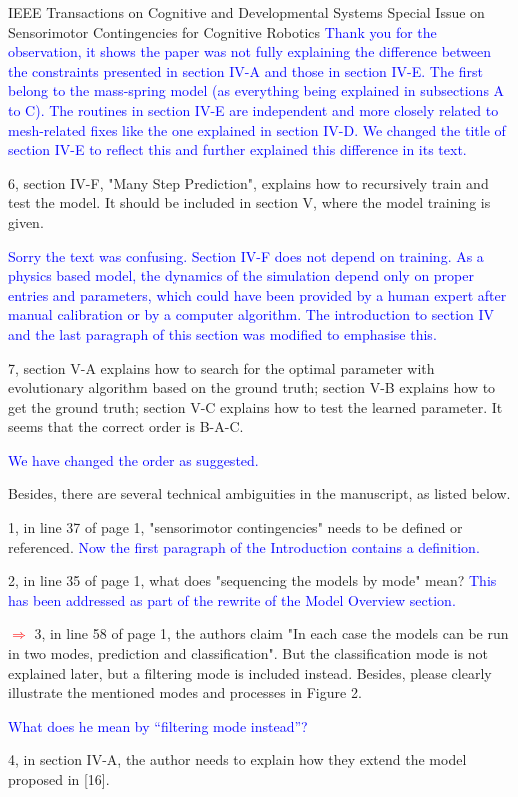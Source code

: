 \documentclass[a4paper,12pt]{letter}
\newcommand{\comment}[1]{\textcolor{blue}{#1}}
\newcommand{\marker}{\hspace*{-1.6em}\textcolor{red}{$\Longrightarrow$}}
\begin{document}
\begin{letter}{IEEE Transactions on Cognitive and Developmental Systems\newline
Special Issue on Sensorimotor Contingencies for Cognitive Robotics}
\comment{Thank you for the observation, it shows the paper was not fully explaining the difference between the constraints presented in section IV-A and those in section IV-E.  The first belong to the mass-spring model (as everything being explained in subsections A to C).  The routines in section IV-E are independent and more closely related to mesh-related fixes like the one explained in section IV-D.  We changed the title of section IV-E to reflect this and further explained this difference in its text.}

6, section IV-F, "Many Step Prediction", explains how to recursively train and test the model. It should be included in section V, where the model training is given.

\comment{Sorry the text was confusing.  Section IV-F does not depend on training.  As a physics based model, the dynamics of the simulation depend only on proper entries and parameters, which could have been provided by a human expert after manual calibration or by a computer algorithm.  The introduction to section IV and the last paragraph of this section was modified to emphasise this.}

7, section V-A explains how to search for the optimal parameter with evolutionary algorithm based on the ground truth; section V-B explains how to get the ground truth; section V-C explains how to test the learned parameter. It seems that the correct order is B-A-C.

\comment{We have changed the order as suggested.}

Besides, there are several technical ambiguities in the manuscript, as listed below. 

1, in line 37 of page 1, "sensorimotor contingencies" needs to be defined or referenced. 
\comment{Now the first paragraph of the Introduction contains a definition.}

2, in line 35 of page 1, what does "sequencing the models by mode" mean? 
\comment{This has been addressed as part of the rewrite of the Model Overview section.}

\marker
3, in line 58 of page 1, the authors claim "In each case the models can be run in two modes, prediction and classification". But the classification mode is not explained later, but a filtering mode is included instead. Besides, please clearly illustrate the mentioned modes and processes in Figure 2.

\comment{What does he mean by ``filtering mode instead''?}

4, in section IV-A, the author needs to explain how they extend the model proposed in [16].


\end{letter}
\end{document}
